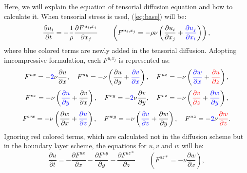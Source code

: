 \documentclass[9pt]{jsarticle}
\begin{document}
Here, we will explain the equation of tensorial diffusion equation and how to calculate it.
When tensorial stress is used, (\ref{eq:base}) will be:
\vspace{-5pt}
\begin{equation}
  \frac{\partial u_i}{\partial t} = -\frac{1}{\rho} \frac{\partial F^{u_i, x_j} }{\partial x_j} \quad\quad \left( F^{u_i, x_j} = -\rho\nu \left( \frac{\partial u_i}{\partial x_j} + \textcolor{blue}{\frac{\partial u_j}{\partial x_i}} \right) \right),
  \label{eq:base_tensor}
\end{equation}
where blue colored terms are newly added in the tensorial diffusion.
Adopting imcompressive formulation, each $F^{u_i x_j}$ is represented as:
\vspace{-5pt}
\begin{equation*}
  F^{ux} = -\textcolor{blue}{2}\nu \frac{\partial u}{\partial x},
  \quad F^{uy} = -\nu \left( \frac{\partial u}{\partial y} + \textcolor{blue}{\frac{\partial v}{\partial x}} \right), 
  \quad F^{uz} = -\nu \left( \textcolor{blue}{\frac{\partial w}{\partial x}} + \textcolor{red}{\frac{\partial u}{\partial z}} \right),
\end{equation*}
\begin{equation*}
  F^{vx} = -\nu \left( \textcolor{blue}{\frac{\partial u}{\partial y}} + \frac{\partial v}{\partial x} \right),
  \quad F^{vy} = -\textcolor{blue}{2} \nu \frac{\partial v}{\partial y}, 
  \quad F^{vz} = -\nu \left( \textcolor{red}{\frac{\partial v}{\partial z}} + \textcolor{blue}{\frac{\partial w}{\partial y}} \right),
\end{equation*}
\begin{equation*}
  F^{wx} = -\nu \left( \frac{\partial w}{\partial x} + \textcolor{blue}{\frac{\partial u}{\partial z}} \right),
  \quad F^{wy} = -\nu \left( \textcolor{blue}{\frac{\partial v}{\partial z}} + \frac{\partial w}{\partial y} \right), 
  \quad F^{uz} = -\textcolor{blue}{2} \nu \textcolor{red}{\frac{\partial w}{\partial z}}.
\end{equation*}
Ignoring red colored terms, which are calculated not in the diffusion scheme but in the boundary layer scheme, the equations for $u, v$ and $w$ will be:
\vspace{-5pt}
\begin{equation}
  \frac{\partial u}{\partial t} = -\frac{\partial F^{ux}}{\partial x} - \frac{\partial F^{uy}}{\partial y} -\frac{\partial F^{uz*}}{\partial z}
  \quad \quad \left( F^{uz*} = -\nu \frac{\partial w}{\partial x}  \right),
  \label{eq:tensu}
\end{equation}
\end{document}
